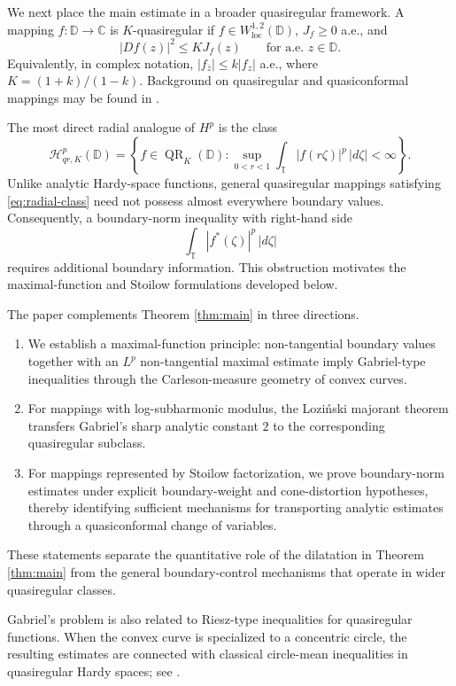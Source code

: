 \documentclass[11pt]{article}
\theoremstyle{definition}
\theoremstyle{remark}
\newcommand{\D}{\mathbb D}
\newcommand{\T}{\mathbb T}
\newcommand{\C}{\mathbb C}
\newcommand{\QR}{\operatorname{QR}}
\begin{document}
We next place the main estimate in a broader quasiregular framework. A mapping $f:\D\to\C$ is $K$-quasiregular if $f\in W^{1,2}_{\mathrm{loc}}(\D)$, $J_f\ge0$ a.e., and
\begin{equation}\label{eq:qr}
   |Df(z)|^2\le KJ_f(z) \qquad \text{for a.e. }z\in\D.
\end{equation}
Equivalently, in complex notation, $|f_{\bar z}|\le k|f_z|$ a.e., where $K=(1+k)/(1-k)$. Background on quasiregular and quasiconformal mappings may be found in \cite{Vaisala1971,AstalaKoskela2011,AdamowiczGonzalez2021,AdamowiczGonzalez2025}.

The most direct radial analogue of $H^p$ is the class
\begin{equation}\label{eq:radial-class}
   \mathcal H^p_{qr,K}(\D)
   =\left\{f\in\QR_K(\D):
     \sup_{0<r<1}\int_\T |f(r\zeta)|^p\,|d\zeta|<\infty\right\}.
\end{equation}
Unlike analytic Hardy-space functions, general quasiregular mappings satisfying \eqref{eq:radial-class} need not possess almost everywhere boundary values. Consequently, a boundary-norm inequality with right-hand side
\[
   \int_\T |f^*(\zeta)|^p\,|d\zeta|
\]
requires additional boundary information. This obstruction motivates the maximal-function and Stoilow formulations developed below.

The paper complements Theorem \ref{thm:main} in three directions.
\begin{enumerate}[label=(\roman*)]
\item We establish a maximal-function principle: non-tangential boundary values together with an $L^p$ non-tangential maximal estimate imply Gabriel-type inequalities through the Carleson-measure geometry of convex curves.
\item For mappings with log-subharmonic modulus, the Lozi\'nski majorant theorem transfers Gabriel's sharp analytic constant $2$ to the corresponding quasiregular subclass.
\item For mappings represented by Stoilow factorization, we prove boundary-norm estimates under explicit boundary-weight and cone-distortion hypotheses, thereby identifying sufficient mechanisms for transporting analytic estimates through a quasiconformal change of variables.
\end{enumerate}
These statements separate the quantitative role of the dilatation in Theorem \ref{thm:main} from the general boundary-control mechanisms that operate in wider quasiregular classes.

Gabriel's problem is also related to Riesz-type inequalities for quasiregular functions. When the convex curve is specialized to a concentric circle, the resulting estimates are connected with classical circle-mean inequalities in quasiregular Hardy spaces; see \cite{Kalaj2025}.
\end{document}
